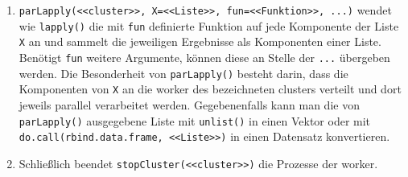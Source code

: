 \begin{enumerate}
\item \label{item:par_pla} \lstinline!parLapply(<<cluster>>, X=<<Liste>>, fun=<<Funktion>>, ...)! wendet wie \lstinline!lapply()! die mit \lstinline!fun! definierte Funktion auf jede Komponente der Liste \lstinline!X! an und sammelt die jeweiligen Ergebnisse als Komponenten einer Liste. Benötigt \lstinline!fun! weitere Argumente, können diese an Stelle der \lstinline!...! übergeben werden. Die Besonderheit von \lstinline!parLapply()! besteht darin, dass die Komponenten von \lstinline!X! an die worker des bezeichneten clusters verteilt und dort jeweils parallel verarbeitet werden. Gegebenenfalls kann man die von \lstinline!parLapply()! ausgegebene Liste mit \lstinline!unlist()! in einen Vektor oder mit \lstinline!do.call(rbind.data.frame, <<Liste>>)! in einen Datensatz konvertieren.
\item \label{item:par_sc} Schließlich beendet \lstinline!stopCluster(<<cluster>>)! die Prozesse der worker.
\end{enumerate}

